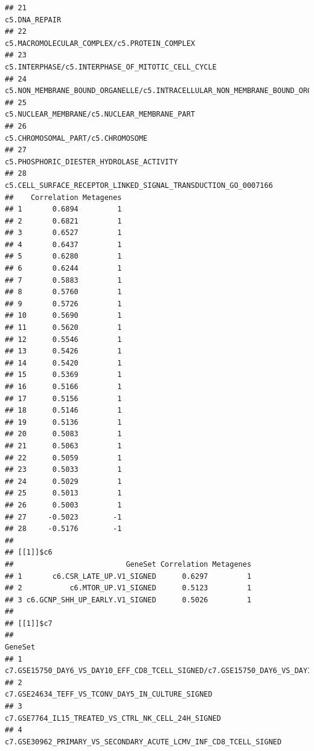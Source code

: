 \documentclass{article}\usepackage[]{graphicx}\usepackage[]{color}
\makeatletter
\newenvironment{kframe}{%
 \def\at@end@of@kframe{}%
 \ifinner\ifhmode%
  \def\at@end@of@kframe{\end{minipage}}%
  \begin{minipage}{\columnwidth}%
 \fi\fi%
 \def\FrameCommand##1{\hskip\@totalleftmargin \hskip-\fboxsep
 \colorbox{shadecolor}{##1}\hskip-\fboxsep
     \hskip-\linewidth \hskip-\@totalleftmargin \hskip\columnwidth}%
 \MakeFramed {\advance\hsize-\width
   \@totalleftmargin\z@ \linewidth\hsize
   \@setminipage}}%
 {\par\unskip\endMakeFramed%
 \at@end@of@kframe}
\newenvironment{knitrout}{}{} %
\makeatother
\begin{document}
\begin{knitrout}
\begin{kframe}
\begin{verbatim}
## 21                                                                         c5.DNA_REPAIR
## 22                                          c5.MACROMOLECULAR_COMPLEX/c5.PROTEIN_COMPLEX
## 23                                     c5.INTERPHASE/c5.INTERPHASE_OF_MITOTIC_CELL_CYCLE
## 24         c5.NON_MEMBRANE_BOUND_ORGANELLE/c5.INTRACELLULAR_NON_MEMBRANE_BOUND_ORGANELLE
## 25                                          c5.NUCLEAR_MEMBRANE/c5.NUCLEAR_MEMBRANE_PART
## 26                                                     c5.CHROMOSOMAL_PART/c5.CHROMOSOME
## 27                                              c5.PHOSPHORIC_DIESTER_HYDROLASE_ACTIVITY
## 28                        c5.CELL_SURFACE_RECEPTOR_LINKED_SIGNAL_TRANSDUCTION_GO_0007166
##    Correlation Metagenes
## 1       0.6894         1
## 2       0.6821         1
## 3       0.6527         1
## 4       0.6437         1
## 5       0.6280         1
## 6       0.6244         1
## 7       0.5883         1
## 8       0.5760         1
## 9       0.5726         1
## 10      0.5690         1
## 11      0.5620         1
## 12      0.5546         1
## 13      0.5426         1
## 14      0.5420         1
## 15      0.5369         1
## 16      0.5166         1
## 17      0.5156         1
## 18      0.5146         1
## 19      0.5136         1
## 20      0.5083         1
## 21      0.5063         1
## 22      0.5059         1
## 23      0.5033         1
## 24      0.5029         1
## 25      0.5013         1
## 26      0.5003         1
## 27     -0.5023        -1
## 28     -0.5176        -1
## 
## [[1]]$c6
##                          GeneSet Correlation Metagenes
## 1       c6.CSR_LATE_UP.V1_SIGNED      0.6297         1
## 2           c6.MTOR_UP.V1_SIGNED      0.5123         1
## 3 c6.GCNP_SHH_UP_EARLY.V1_SIGNED      0.5026         1
## 
## [[1]]$c7
##                                                                                                                                                                               GeneSet
## 1                                                                               c7.GSE15750_DAY6_VS_DAY10_EFF_CD8_TCELL_SIGNED/c7.GSE15750_DAY6_VS_DAY10_TRAF6KO_EFF_CD8_TCELL_SIGNED
## 2                                                                                                                                    c7.GSE24634_TEFF_VS_TCONV_DAY5_IN_CULTURE_SIGNED
## 3                                                                                                                                  c7.GSE7764_IL15_TREATED_VS_CTRL_NK_CELL_24H_SIGNED
## 4                                                                                                                    c7.GSE30962_PRIMARY_VS_SECONDARY_ACUTE_LCMV_INF_CD8_TCELL_SIGNED

\end{verbatim}
\end{kframe}
\end{knitrout}
\end{document}
